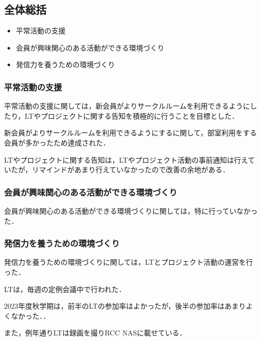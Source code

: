 \subsection*{全体総括}


\begin{itemize}
    \item 平常活動の支援
    \item 会員が興味関心のある活動ができる環境づくり
    \item 発信力を養うための環境づくり
  \end{itemize}
  
  \subsubsection*{平常活動の支援}
  平常活動の支援に関しては，新会員がよりサークルルームを利用できるようにしたり，LTやプロジェクトに関する告知を積極的に行うことを目標とした．

  新会員がよりサークルルームを利用できるようにするに関して，部室利用をする会員が多かったため達成された．

  LTやプロジェクトに関する告知は，LTやプロジェクト活動の事前通知は行えていたが，リマインドがあまり行えていなかったので改善の余地がある．
  
  \subsubsection*{会員が興味関心のある活動ができる環境づくり}
  会員が興味関心のある活動ができる環境づくりに関しては，特に行っていなかった．
  
  \subsubsection*{発信力を養うための環境づくり}
  発信力を養うための環境づくりに関しては，LTとプロジェクト活動の運営を行った．
  
  LTは，毎週の定例会議中で行われた．
  
  2023年度秋学期は，前半のLTの参加率はよかったが，後半の参加率はあまりよくなかった．．
  
  また，例年通りLTは録画を撮りRCC NASに載せている．